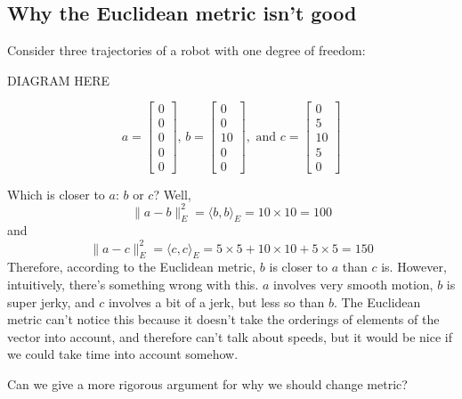 \documentclass[twoside]{article}
\begin{document}
\subsection{Why the Euclidean metric isn't good}
\label{sec:why-euclidean-metric}

Consider three trajectories of a robot with one degree of freedom:

DIAGRAM HERE

\begin{equation}
  \label{eq:3}
  a =
  \begin{bmatrix}
    0 \\
    0 \\
    0 \\
    0 \\
    0
  \end{bmatrix},\, b =
  \begin{bmatrix}
    0 \\
    0 \\
    10 \\
    0 \\
    0
  \end{bmatrix}, \text{ and } c =
  \begin{bmatrix}
    0 \\
    5 \\
    10 \\
    5 \\
    0
  \end{bmatrix}
\end{equation}

Which is closer to $a$: $b$ or $c$? Well,
\begin{equation}
  \label{eq:4}
  \|a - b \|^2_E = \langle b, b \rangle_E = 10 \times 10 = 100
\end{equation}
and
\begin{equation}
  \label{eq:5}
  \|a - c \|^2_E = \langle c, c \rangle_E = 5 \times 5 + 10 \times 10 + 5 \times 5 = 150
\end{equation}
Therefore, according to the Euclidean metric, $b$ is closer to $a$ than $c$ is. However, intuitively, there's something wrong with this. $a$ involves very smooth motion, $b$ is super jerky, and $c$ involves a bit of a jerk, but less so than $b$. The Euclidean metric can't notice this because it doesn't take the orderings of elements of the vector into account, and therefore can't talk about speeds, but it would be nice if we could take time into account somehow.

Can we give a more rigorous argument for why we should change metric?
\end{document}

